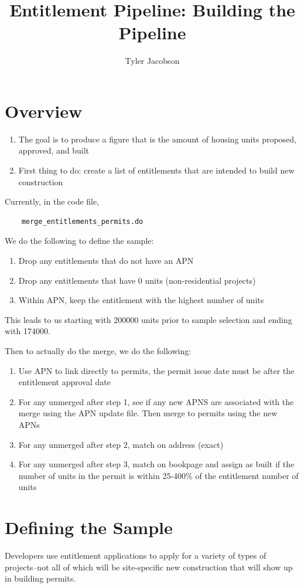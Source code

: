 \documentclass[12pt]{article}
\title{Entitlement Pipeline: Building the Pipeline}
\author{Tyler Jacobson}
\theoremstyle{definition}
\begin{document}
\maketitle
\section{Overview}
\begin{enumerate}
    \item The goal is to produce a figure that is the amount of housing units proposed, approved, and built
    \item First thing to do: create a list of entitlements that are intended to build new construction
\end{enumerate}

Currently, in the code file, 
\begin{verbatim}
    merge_entitlements_permits.do
\end{verbatim}
We do the following to define the sample:
\begin{enumerate}
    \item Drop any entitlements that do not have an APN 
    \item Drop any entitlements that have 0 units (non-residential projects)
    \item Within APN, keep the entitlement with the highest number of units
\end{enumerate}
This leads to us starting with 200000 units prior to sample selection and ending with 174000.

Then to actually do the merge, we do the following:
\begin{enumerate}
    \item Use APN to link directly to permits, the permit issue date must be after the entitlement approval date
    \item For any unmerged after step 1, see if any new APNS are associated with the merge using the APN update file. Then merge to permits using the new APNs
    \item For any unmerged after step 2, match on address (exact)
    \item For any unmerged after step 3, match on bookpage and assign as built if the number of units in the permit is within 25-400\% of the entitlement number of units 
\end{enumerate}

\section{Defining the Sample}
Developers use entitlement applications to apply for a variety of types of projects--not all of which will be site-specific new construction that will show up in building permits. 
\end{document}
